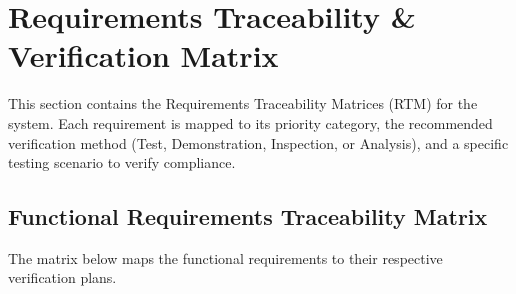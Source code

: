 \documentclass[11pt,a4paper]{article}
\begin{document}
\newpage
\section{Requirements Traceability \& Verification Matrix}
This section contains the Requirements Traceability Matrices (RTM) for the system. Each requirement is mapped to its priority category, the recommended verification method (Test, Demonstration, Inspection, or Analysis), and a specific testing scenario to verify compliance.

\subsection{Functional Requirements Traceability Matrix}
The matrix below maps the functional requirements to their respective verification plans.
\end{document}
